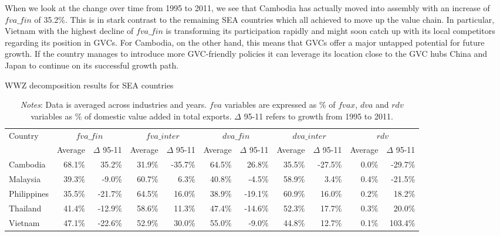 \documentclass[a4paper,11pt]{article}
\begin{document}
When we look at the change over time from 1995 to 2011, we see that Cambodia has actually moved into assembly with an increase of $fva\_fin$ of 35.2\%. This is in stark contrast to the remaining SEA countries which all achieved to move up the value chain. In particular, Vietnam with the highest decline of $fva\_fin$ is transforming its participation rapidly and might soon catch up with its local competitors regarding its position in GVCs. For Cambodia, on the other hand, this means that GVCs offer a major untapped potential for future growth. If the country manages to introduce more GVC-friendly policies it can leverage its location close to the GVC hubs China and Japan to continue on its successful growth path.

\begin{table}[!h]\small
  \centering
  \caption{WWZ decomposition results for SEA countries}
  \hspace*{-2.9cm}
    \begin{tabular}{lrrrrrrrrrr} 
    \toprule
    \multicolumn{1}{l}{{Country}} & \multicolumn{2}{c}{$fva\_fin$} & \multicolumn{2}{c}{$fva\_inter$} & \multicolumn{2}{c}{$dva\_fin$} & \multicolumn{2}{c}{$dva\_inter$} & \multicolumn{2}{c}{$rdv$} \\
    \multicolumn{1}{l}{} & \multicolumn{1}{c}{Average} & \multicolumn{1}{c}{$\Delta$ 95-11} &
\multicolumn{1}{c}{Average} & \multicolumn{1}{c}{$\Delta$ 95-11} & \multicolumn{1}{c}{Average} & \multicolumn{1}{c}{$\Delta$ 95-11} & \multicolumn{1}{c}{Average} & \multicolumn{1}{c}{$\Delta$ 95-11} & \multicolumn{1}{c}{Average} & \multicolumn{1}{c}{$\Delta$ 95-11} \\
  \midrule
    Cambodia & 68.1\% & 35.2\% & 31.9\% & -35.7\% & 64.5\% & 26.8\% & 35.5\% & -27.5\% & 0.0\% & -29.7\% \\
    Malaysia & 39.3\% & -9.0\% & 60.7\% & 6.3\% & 40.8\% & -4.5\% & 58.9\% & 3.4\% & 0.4\% & -21.5\% \\
    Philippines & 35.5\% & -21.7\% & 64.5\% & 16.0\% & 38.9\% & -19.1\% & 60.9\% & 16.0\% & 0.2\% & 18.2\% \\
    Thailand & 41.4\% & -12.9\% & 58.6\% & 11.3\% & 47.4\% & -14.6\% & 52.3\% & 17.7\% & 0.3\% & 20.0\% \\
    Vietnam & 47.1\% & -22.6\% & 52.9\% & 30.0\% & 55.0\% & -9.0\% & 44.8\% & 12.7\% & 0.1\% & 103.4\% \\
    \bottomrule
    \end{tabular}
  \label{tab:seawwz}
   \caption*{\textit{Notes}: Data is averaged across industries and years. $fva$ variables are expressed as \% of $fvax$, $dva$ and $rdv$ variables as \% of domestic value added in total exports. $\Delta$ 95-11 refers to growth from 1995 to 2011.}
\end{table}
\end{document}

